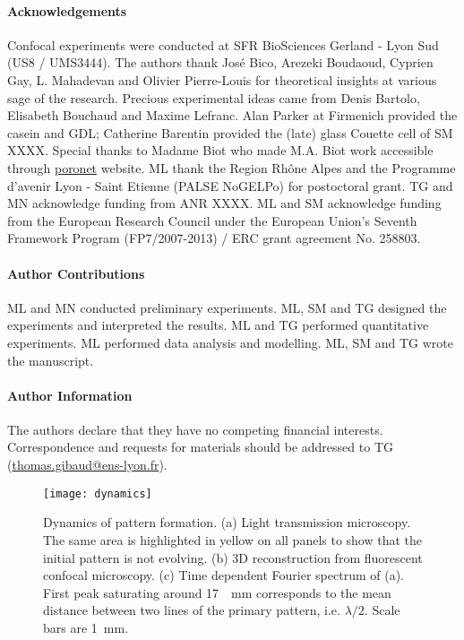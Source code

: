 \documentclass[twocolumn,superscriptaddress,showpacs,preprintnumbers,amsmath,amssymb,prl]{revtex4-1}
\begin{document}


\paragraph*{Acknowledgements}
Confocal experiments were conducted at SFR BioSciences Gerland - Lyon Sud (US8 / UMS3444).
The authors thank José Bico, Arezeki Boudaoud, Cyprien Gay, L. Mahadevan and Olivier Pierre-Louis for theoretical insights at various sage of the research. 
Precious experimental ideas came from Denis Bartolo, Elisabeth Bouchaud and Maxime Lefranc.
Alan Parker at Firmenich provided the casein and GDL; Catherine Barentin provided the (late) glass Couette cell of SM XXXX.
Special thanks to Madame Biot who made M.A. Biot work accessible through \href{http://www.olemiss.edu/sciencenet/poronet/}{poronet} website. 
ML thank the Region Rhône Alpes and the Programme d'avenir Lyon - Saint Etienne (PALSE NoGELPo) for postoctoral grant. 
TG and MN acknowledge funding from ANR XXXX. 
ML and SM acknowledge funding from the European Research Council under the European Union's Seventh Framework Program (FP7/2007-2013) / ERC grant agreement No. 258803.


\paragraph*{Author Contributions}
ML and MN conducted preliminary experiments. ML, SM and TG designed the experiments and interpreted the results. ML and TG performed quantitative experiments. ML performed data analysis and modelling. ML, SM and TG wrote the manuscript.


\paragraph*{Author Information} 
The authors declare that they have no competing financial interests. 
Correspondence and requests for materials should be addressed to TG (\href{mailto:thomas.gibaud@ens-lyon.fr}{thomas.gibaud@ens-lyon.fr}).



\begin{figure}
	\texttt{[image: dynamics]}
	\caption{Dynamics of pattern formation. (a) Light transmission microscopy. The same area is highlighted in yellow on all panels to show that the initial pattern is not evolving. (b) 3D reconstruction from fluorescent confocal microscopy. (c) Time dependent Fourier spectrum of (a). First peak saturating around \SI{17}{\per\milli\metre} corresponds to the mean distance between two lines of the primary pattern, i.e. $\lambda/2$. Scale bars are \SI{1}{\milli\metre}.}
	\label{fig:dynamics}
\end{figure}
\end{document}

